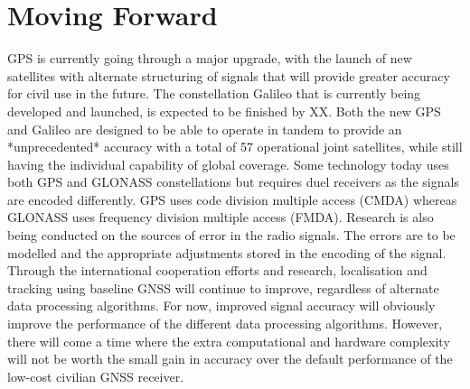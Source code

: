 
\section{Moving Forward} %
GPS is currently going through a major upgrade, with the launch of new satellites with alternate structuring of signals that will provide greater accuracy for civil use in the future. The constellation Galileo that is currently being developed and launched, is expected to be finished by XX. Both the new GPS and Galileo are designed to be able to operate in tandem to provide an *unprecedented* accuracy with a total of 57 operational joint satellites, while still having the individual capability of global coverage. Some technology today uses both GPS and GLONASS constellations but requires duel receivers as the signals are encoded differently. GPS uses code division multiple access (CMDA) whereas GLONASS uses frequency division multiple access (FMDA). Research is also being conducted on the sources of error in the radio signals. The errors are to be modelled and the appropriate adjustments stored in the encoding of the signal. Through the international cooperation efforts and research, localisation and tracking using baseline GNSS will continue to improve, regardless of alternate data processing algorithms. For now, improved signal accuracy will obviously improve the performance of the different data processing algorithms. However, there will come a time where the extra computational and hardware complexity will not be worth the small gain in accuracy over the default performance of the low-cost civilian GNSS receiver.
